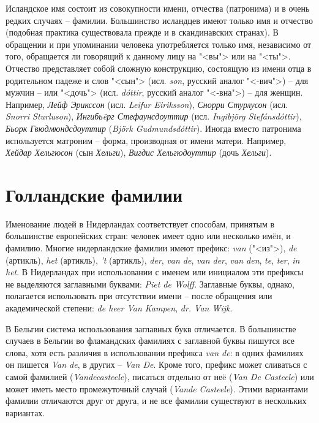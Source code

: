 Исландское имя состоит из совокупности имени, отчества (патронима) и в очень редких случаях -- фамилии. Большинство исландцев имеют только имя и отчество (подобная практика существовала прежде и в скандинавских странах). В обращении и при упоминании человека употребляется только имя, независимо от того, обращается ли говорящий к данному лицу на "<вы"> или на "<ты">. Отчество представляет собой сложную конструкцию, состоящую из имени отца в родительном падеже и слов "<сын"> (исл. \emph{son}, русский аналог "<-вич">) -- для мужчин -- или "<дочь"> (исл. \emph{d\'ottir}, русский аналог "<-вна">) -- для женщин. Например, \emph{Лейф Эрикссон} (исл. \emph{Leifur Eiriksson}), \emph{Снорри Стурлусон} (исл. \emph{Snorri Sturluson}), \emph{Ингибь\"eрг Стефаунсдоуттир} (исл. \emph{Ingibj\"org Stef\'ansd\'ottir}), \emph{Бьорк Гвюдмюндсдоуттир} (\emph{Bj\"ork Gudmundsd\'ottir}). Иногда вместо патронима используется матроним -- форма, производная от имени матери. Например, \emph{Хейдар Хельгюсон} (сын \emph{Хельги}), \emph{Вигдис Хельгюдоуттир} (дочь \emph{Хельги}).

\section{Голландские фамилии}

Именование людей в Нидерландах соответствует способам, принятым в большинстве европейских стран: человек имеет одно или несколько им\"eн, и фамилию. Многие нидерландские фамилии имеют префикс: \emph{van} ("<из">), \emph{de} (артикль), \emph{het} (артикль), \emph{'t} (артикль), \emph{der}, \emph{van de}, \emph{van der}, \emph{van den}, \emph{te}, \emph{ter}, \emph{in het}. В Нидерландах при использовании с именем или инициалом эти префиксы не выделяются заглавными буквами: \emph{Piet de Wolff}. Заглавные буквы, однако, полагается использовать при отсутствии имени -- после обращения или академической степени: \emph{de heer Van Kampen}, \emph{dr. Van Wijk}.

В Бельгии система использования заглавных букв отличается. В большинстве случаев в Бельгии во фламандских фамилиях с заглавной буквы пишутся все слова, хотя есть различия в использовании префикса \emph{van de}: в одних фамилиях он пишется \emph{Van de}, в других -- \emph{Van De}. Кроме того, префикс может сливаться с самой фамилией (\emph{Vandecasteele}), писаться отдельно от не\"e (\emph{Van De Casteele}) или может иметь место промежуточный случай (\emph{Vande Casteele}). Этими вариантами фамилии отличаются друг от друга, и не все фамилии существуют в нескольких вариантах.

